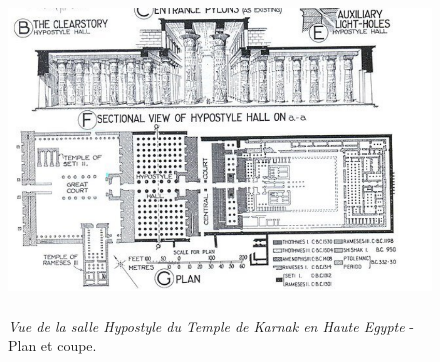 \documentclass[a4paper,12pt]{article}
\begin{document}
\begin{appendix}


\begin{figure}
\centering
\includegraphics[width=14.5cm,height=8.6cm]{./figures/karnak.png}
\caption [Plan du Temple de Karnak]{\textit{Vue de la salle Hypostyle du Temple de Karnak en Haute Egypte} - Plan et coupe.} 
\label{fig:4:figure4}
\end{figure}


\end{appendix}
\end{document}
